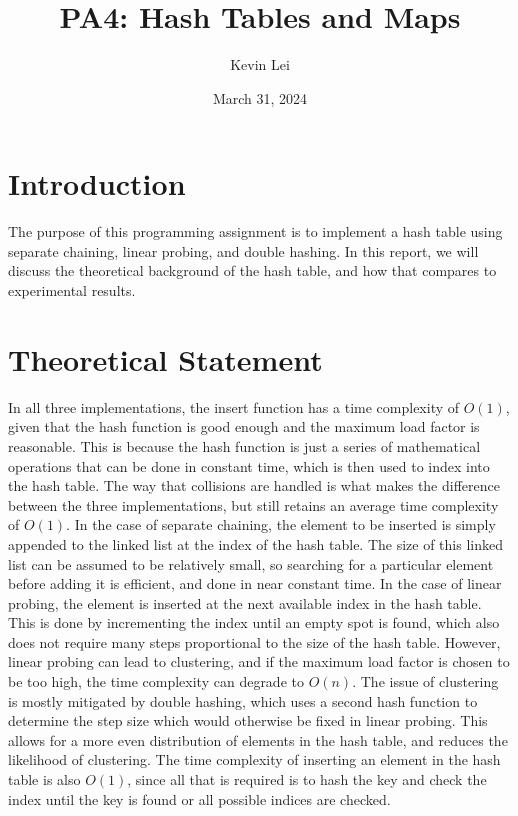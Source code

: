 \documentclass{article}
\title{PA4: Hash Tables and Maps}
\author{Kevin Lei}
\date{March 31, 2024}
\begin{document}
\maketitle

\section{Introduction}
The purpose of this programming assignment is to implement a hash table using separate chaining, linear probing, and double hashing.
In this report, we will discuss the theoretical background of the hash table, and how that compares to experimental results.

\section{Theoretical Statement}
In all three implementations, the insert function has a time complexity of $O(1)$, given that the hash function is good enough and the maximum load factor is reasonable.
This is because the hash function is just a series of mathematical operations that can be done in constant time, which is then used to index into the hash table.
The way that collisions are handled is what makes the difference between the three implementations, but still retains an average time complexity of $O(1)$.
In the case of separate chaining, the element to be inserted is simply appended to the linked list at the index of the hash table.
The size of this linked list can be assumed to be relatively small, so searching for a particular element before adding it is efficient, and done in near constant time.
In the case of linear probing, the element is inserted at the next available index in the hash table.
This is done by incrementing the index until an empty spot is found, which also does not require many steps proportional to the size of the hash table.
However, linear probing can lead to clustering, and if the maximum load factor is chosen to be too high, the time complexity can degrade to $O(n)$.
The issue of clustering is mostly mitigated by double hashing, which uses a second hash function to determine the step size which would otherwise be fixed in linear probing.
This allows for a more even distribution of elements in the hash table, and reduces the likelihood of clustering.
The time complexity of inserting an element in the hash table is also $O(1)$, since all that is required is to hash the key and check the index until the key is found or all possible indices are checked.
\end{document}

